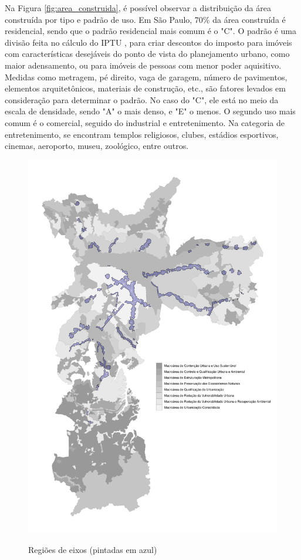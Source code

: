 \begin{apendicesenv}
Na Figura \ref{fig:area_construida}, é possível observar a distribuição da área construída por tipo e padrão de uso. Em São Paulo, 70\% da área construída é residencial, sendo que o padrão residencial mais comum é o "C". O padrão é uma divisão feita no cálculo do IPTU \cite{lei10235_1986}, para criar descontos do imposto para imóveis com características desejáveis do ponto de vista do planejamento urbano, como maior adensamento, ou para imóveis de pessoas com menor poder aquisitivo. Medidas como metragem, pé direito, vaga de garagem, número de pavimentos, elementos arquitetônicos, materiais de construção, etc., são fatores levados em consideração para determinar o padrão. No caso do "C", ele está no meio da escala de densidade, sendo "A" o mais denso, e "E" o menos. O segundo uso mais comum é o comercial, seguido do industrial e entretenimento. Na categoria de entretenimento, se encontram templos religiosos, clubes, estádios esportivos, cinemas, aeroporto, museu, zoológico, entre outros.






\begin{figure}[!h]
    \centering
    \caption{Regiões de eixos (pintadas em azul)}
    \includegraphics[width = .85\linewidth]{figuras/macroareas-eixos.pdf}
    \label{fig:eixos}
\end{figure}


\end{apendicesenv}
